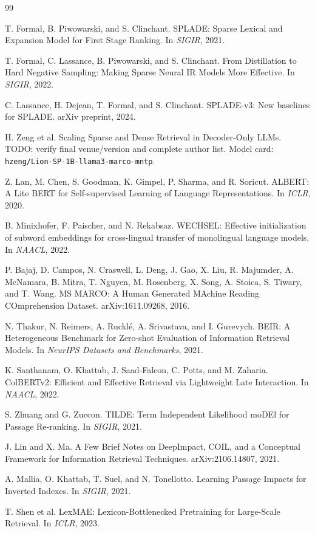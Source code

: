 \documentclass[
]{ceurart}
\begin{document}
\begin{thebibliography}{99}

T. Formal, B. Piwowarski, and S. Clinchant.
\newblock SPLADE: Sparse Lexical and Expansion Model for First Stage Ranking.
\newblock In \emph{SIGIR}, 2021.

T. Formal, C. Lassance, B. Piwowarski, and S. Clinchant.
\newblock From Distillation to Hard Negative Sampling: Making Sparse Neural IR Models More Effective.
\newblock In \emph{SIGIR}, 2022.

C. Lassance, H. Dejean, T. Formal, and S. Clinchant.
\newblock SPLADE-v3: New baselines for SPLADE.
\newblock arXiv preprint, 2024.

H. Zeng et al.
\newblock Scaling Sparse and Dense Retrieval in Decoder-Only LLMs.
\newblock TODO: verify final venue/version and complete author list. Model card:
\texttt{hzeng/Lion-SP-1B-llama3-marco-mntp}.

Z. Lan, M. Chen, S. Goodman, K. Gimpel, P. Sharma, and R. Soricut.
\newblock ALBERT: A Lite BERT for Self-supervised Learning of Language Representations.
\newblock In \emph{ICLR}, 2020.

B. Minixhofer, F. Paischer, and N. Rekabsaz.
\newblock WECHSEL: Effective initialization of subword embeddings for cross-lingual transfer of monolingual language models.
\newblock In \emph{NAACL}, 2022.

P. Bajaj, D. Campos, N. Craswell, L. Deng, J. Gao, X. Liu, R. Majumder,
A. McNamara, B. Mitra, T. Nguyen, M. Rosenberg, X. Song, A. Stoica,
S. Tiwary, and T. Wang.
\newblock MS MARCO: A Human Generated MAchine Reading COmprehension Dataset.
\newblock arXiv:1611.09268, 2016.

N. Thakur, N. Reimers, A. Ruckl\'e, A. Srivastava, and I. Gurevych.
\newblock BEIR: A Heterogeneous Benchmark for Zero-shot Evaluation of Information Retrieval Models.
\newblock In \emph{NeurIPS Datasets and Benchmarks}, 2021.

K. Santhanam, O. Khattab, J. Saad-Falcon, C. Potts, and M. Zaharia.
\newblock ColBERTv2: Efficient and Effective Retrieval via Lightweight Late Interaction.
\newblock In \emph{NAACL}, 2022.

S. Zhuang and G. Zuccon.
\newblock TILDE: Term Independent Likelihood moDEl for Passage Re-ranking.
\newblock In \emph{SIGIR}, 2021.

J. Lin and X. Ma.
\newblock A Few Brief Notes on DeepImpact, COIL, and a Conceptual Framework for Information Retrieval Techniques.
\newblock arXiv:2106.14807, 2021.

A. Mallia, O. Khattab, T. Suel, and N. Tonellotto.
\newblock Learning Passage Impacts for Inverted Indexes.
\newblock In \emph{SIGIR}, 2021.

T. Shen et al.
\newblock LexMAE: Lexicon-Bottlenecked Pretraining for Large-Scale Retrieval.
\newblock In \emph{ICLR}, 2023.

\end{thebibliography}
\end{document}
